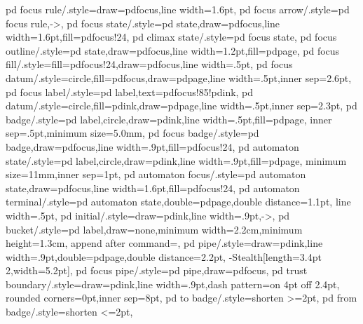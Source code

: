 {  pd focus rule/.style={draw=pdfocus,line width=1.6pt},
  pd focus arrow/.style={pd focus rule,->},
  pd focus state/.style={pd state,draw=pdfocus,line width=1.6pt,fill=pdfocus!24},
  pd climax state/.style={pd focus state},
  pd focus outline/.style={pd state,draw=pdfocus,line width=1.2pt,fill=pdpage},
  pd focus fill/.style={fill=pdfocus!24,draw=pdfocus,line width=.5pt},
  pd focus datum/.style={circle,fill=pdfocus,draw=pdpage,line width=.5pt,inner sep=2.6pt},
  pd focus label/.style={pd label,text=pdfocus!85!pdink},
%
  pd datum/.style={circle,fill=pdink,draw=pdpage,line width=.5pt,inner sep=2.3pt},
  pd badge/.style={pd label,circle,draw=pdink,line width=.5pt,fill=pdpage,
    inner sep=.5pt,minimum size=5.0mm},
  pd focus badge/.style={pd badge,draw=pdfocus,line width=.9pt,fill=pdfocus!24},
  pd automaton state/.style={pd label,circle,draw=pdink,line width=.9pt,fill=pdpage,
    minimum size=11mm,inner sep=1pt},
  pd automaton focus/.style={pd automaton state,draw=pdfocus,line width=1.6pt,fill=pdfocus!24},
  pd automaton terminal/.style={pd automaton state,double=pdpage,double distance=1.1pt,
    line width=.5pt},
  pd initial/.style={draw=pdink,line width=.9pt,->},
  pd bucket/.style={pd label,draw=none,minimum width=2.2cm,minimum height=1.3cm,
    append after command={}},
  pd pipe/.style={draw=pdink,line width=.9pt,double=pdpage,double distance=2.2pt,
    -{Stealth[length=3.4pt 2,width=5.2pt]}},
  pd focus pipe/.style={pd pipe,draw=pdfocus},
  pd trust boundary/.style={draw=pdink,line width=.9pt,dash pattern=on 4pt off 2.4pt,
    rounded corners=0pt,inner sep=8pt},
  pd to badge/.style={shorten >=2pt},
  pd from badge/.style={shorten <=2pt},
}

